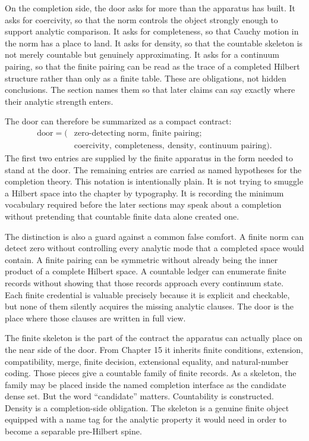 On the completion side, the door asks for more than the apparatus has built. It
asks for coercivity, so that the norm controls the object strongly enough to
support analytic comparison. It asks for completeness, so that Cauchy motion in
the norm has a place to land. It asks for density, so that the countable
skeleton is not merely countable but genuinely approximating. It asks for a
continuum pairing, so that the finite pairing can be read as the trace of a
completed Hilbert structure rather than only as a finite table. These are
obligations, not hidden conclusions. The section names them so that later
claims can say exactly where their analytic strength enters.

The door can therefore be summarized as a compact contract:
\[
  \begin{aligned}
  \text{door}=\big(&
    \text{zero-detecting norm},\ \text{finite pairing};\\
    &\text{coercivity},\ \text{completeness},\
      \text{density},\ \text{continuum pairing}
  \big).
  \end{aligned}
\]
The first two entries are supplied by the finite apparatus in the form needed
to stand at the door. The remaining entries are carried as named hypotheses for
the completion theory. This notation is intentionally plain. It is not trying
to smuggle a Hilbert space into the chapter by typography. It is recording the
minimum vocabulary required before the later sections may speak about a
completion without pretending that countable finite data alone created one.

The distinction is also a guard against a common false comfort. A finite norm
can detect zero without controlling every analytic mode that a completed space
would contain. A finite pairing can be symmetric without already being the
inner product of a complete Hilbert space. A countable ledger can enumerate
finite records without showing that those records approach every continuum
state. Each finite credential is valuable precisely because it is explicit and
checkable, but none of them silently acquires the missing analytic clauses. The
door is the place where those clauses are written in full view.

The finite skeleton is the part of the contract the apparatus can actually
place on the near side of the door. From Chapter 15 it inherits finite
conditions, extension, compatibility, merge, finite decision, extensional
equality, and natural-number coding. Those pieces give a countable family of
finite records. As a skeleton, the family may be placed inside the named
completion interface as the candidate dense set. But the word ``candidate''
matters. Countability is constructed. Density is a completion-side obligation.
The skeleton is a genuine finite object equipped with a name tag for the
analytic property it would need in order to become a separable pre-Hilbert
spine.

